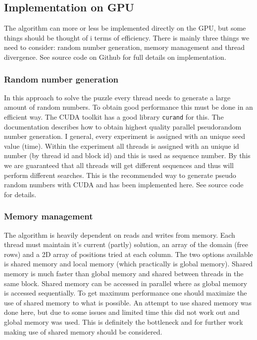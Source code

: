 \documentclass{article}
\begin{document}
\subsection{Implementation on GPU}

The algorithm can more or less be implemented directly on the GPU, but some things should be thought of i terms
of efficiency. There is mainly three things we need to consider: random
number generation, memory management and thread divergence. See source code on Github \cite{github} for full details on implementation.

\subsubsection{Random number generation} %
\label{sub:random_number_generation}
In this approach to solve the puzzle every thread needs to generate a large amount of random numbers.
To obtain good performance this must be done in an efficient way. 
The CUDA toolkit has a good library \verb|curand| \cite{curand} for this. The documentation describes 
how to obtain highest quality parallel pseudorandom number generation. I general, every experiment is assigned with an unique 
seed value (time). Within the experiment all threads is assigned with an unique id number (by thread id and block id) and this 
is used as sequence number. By this we are guaranteed that all threads will get different sequences and thus will perform different
searches. This is the recommended way to generate pseudo random numbers with CUDA and has been implemented here. See source code for details.

\subsubsection{Memory management} %
\label{sub:memory_management}

The algorithm is heavily dependent on reads and writes from memory. Each thread must maintain it's current (partly) solution,
an array of the domain (free rows) and a 2D array of positions tried at each column. The two options available is shared memory and local memory (which practically is global memory). 
Shared memory is much faster than global memory and shared between threads in the same block. Shared memory can be accessed in parallel
where as global memory is accessed sequentially. To get maximum performance one should maximize the use of shared memory to what is possible.
An attempt to use shared memory was done here, but due to some issues and limited time this did not work out and global memory was used. This is 
definitely the bottleneck and for further work making use of shared memory should be considered. 
\end{document}
